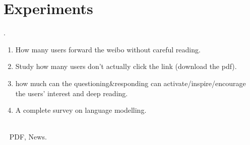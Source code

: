 \section{Experiments}
. 
\begin{enumerate}
\item How many users forward the weibo without careful reading.
\item Study how many users don't actually click the link (download the pdf).
\item how much can the questioning\&responding can activate/inspire/encourage the users' interest and deep reading.
\item A complete survey on language modelling. \cite{karpathy2015deep} \cite{liu2014recursive}
\end{enumerate}

 \\~
 PDF, News. \\~
